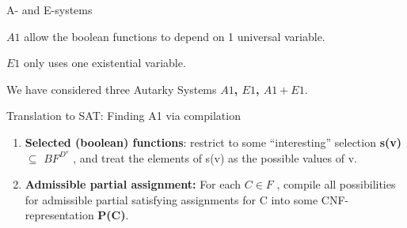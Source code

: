\documentclass[xcolor=table	]{beamer}
\begin{document}
\begin{frame}{A- and E-systems}

\vspace{0.4cm}

  $A1$ allow the boolean functions to  
  depend on 1 universal variable. \newline 

  $E1$ only uses one existential variable. \newline 
  
  We have considered three Autarky Systems \newline 
  \textbf{$A1$, $E1$, $A1 + E1$}.

\end{frame}

%

\begin{frame}{Translation to SAT: Finding A1 via compilation}
\begin{enumerate}
    \item \textbf{Selected (boolean) functions}: restrict to some “interesting” selection \textbf{s(v)} $\subseteq$ $BF^{D^v}$ , and treat the elements of s(v) as the possible values of v. \newline 
    
    \item \textbf{Admissible partial assignment:} For each $C \in F$ , compile all possibilities for admissible partial satisfying assignments for C into some CNF-representation \textbf{P(C)}.
\end{enumerate}

\end{frame}
\end{document}
